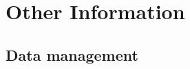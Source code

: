 \documentclass{article}
\begin{document}




\section{Other Information}
\label{sec:other}
\subsection{Data management}


\end{document}
